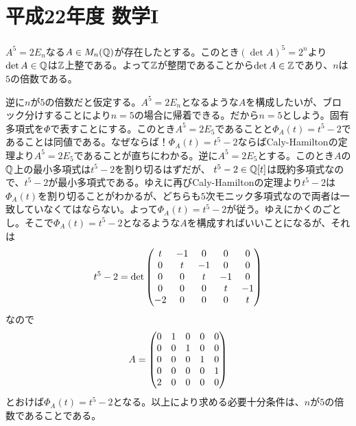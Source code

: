 \section{平成22年度 数学I}

\subsubsection{}%
\begin{sol}
  $A^5 = 2E_n$なる$A \in M_n({\mathbb Q})$が存在したとする。このとき$(\det A)^5 = 2^n$より$\det A \in {\mathbb Q}$は${\mathbb Z}$上整である。よって${\mathbb Z}$が整閉であることから$\det A \in {\mathbb Z}$であり、$n$は$5$の倍数である。

  逆に$n$が$5$の倍数だと仮定する。$A^5 = 2E_n$となるような$A$を構成したいが、ブロック分けすることにより$n=5$の場合に帰着できる。だから$n=5$としよう。固有多項式を$\Phi$で表すことにする。このとき$A^5 = 2E_5$であることと$\Phi_A(t) = t^5 -2$であることは同値である。なぜならば！$\Phi_A(t) = t^5 -2$ならばCaly-Hamiltonの定理より$A^5 = 2E_5$であることが直ちにわかる。逆に$A^5 = 2E_5$とする。このとき$A$の${\mathbb Q}$上の最小多項式は$t^5 -2$を割り切るはずだが、
  $t^5 -2 \in {\mathbb Q}[t]$は既約多項式なので、$t^5 -2$が最小多項式である。ゆえに再びCaly-Hamiltonの定理より$t^5 - 2$は$\Phi_A(t)$を割り切ることがわかるが、どちらも$5$次モニック多項式なので両者は一致していなくてはならない。よって$\Phi_A(t)=t^5 -2$が従う。ゆえにかくのごとし。そこで$\Phi_A(t) = t^5 -2$となるような$A$を構成すればいいことになるが、それは
  \[
  t^5 - 2 = \det \begin{pmatrix}  t& -1& 0& 0& 0 \\ 0& t& -1& 0& 0 \\ 0& 0& t& -1& 0  \\ 0& 0& 0& t& -1 \\ -2 &0& 0& 0& t \end{pmatrix}
  \]
  なので
  \[
  A =  \begin{pmatrix}  0& 1& 0& 0& 0 \\ 0& 0& 1& 0& 0 \\ 0& 0& 0& 1& 0  \\ 0& 0& 0& 0& 1 \\ 2 &0& 0& 0& 0 \end{pmatrix}
  \]
  とおけば$\Phi_A(t)=t^5 - 2$となる。以上により求める必要十分条件は、$n$が$5$の倍数であることである。
\end{sol}

\newpage

\subsubsection{}%

